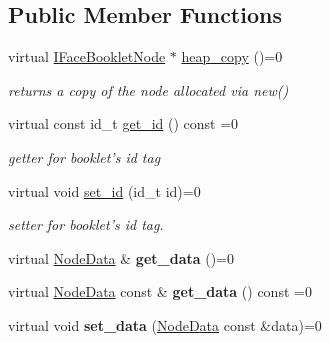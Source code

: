 \subsection*{Public Member Functions}
\begin{DoxyCompactItemize}
\item 
\hypertarget{structfb_1_1_i_face_booklet_node_a9bc90104d8cb2953baee204811aab1cf}{virtual \hyperlink{structfb_1_1_i_face_booklet_node}{I\+Face\+Booklet\+Node} $\ast$ \hyperlink{structfb_1_1_i_face_booklet_node_a9bc90104d8cb2953baee204811aab1cf}{heap\+\_\+copy} ()=0}\label{structfb_1_1_i_face_booklet_node_a9bc90104d8cb2953baee204811aab1cf}

\begin{DoxyCompactList}\small\item\em returns a copy of the node allocated via new() \end{DoxyCompactList}\item 
virtual const id\+\_\+t \hyperlink{structfb_1_1_i_face_booklet_node_a651a6fb7445f8d2c046066c1d381f424}{get\+\_\+id} () const =0
\begin{DoxyCompactList}\small\item\em getter for booklet's id tag \end{DoxyCompactList}\item 
virtual void \hyperlink{structfb_1_1_i_face_booklet_node_a944a07a514d6c88414c533dc7be3193d}{set\+\_\+id} (id\+\_\+t id)=0
\begin{DoxyCompactList}\small\item\em setter for booklet's id tag. \end{DoxyCompactList}\item 
\hypertarget{structfb_1_1_i_face_booklet_node_acfe552a2e1c8b67bb2ffeb22e319251d}{virtual \hyperlink{classfb_1_1_node_data}{Node\+Data} \& {\bfseries get\+\_\+data} ()=0}\label{structfb_1_1_i_face_booklet_node_acfe552a2e1c8b67bb2ffeb22e319251d}

\item 
\hypertarget{structfb_1_1_i_face_booklet_node_a5f41418b1a6d7100b6ab340a63046713}{virtual \hyperlink{classfb_1_1_node_data}{Node\+Data} const \& {\bfseries get\+\_\+data} () const =0}\label{structfb_1_1_i_face_booklet_node_a5f41418b1a6d7100b6ab340a63046713}

\item 
\hypertarget{structfb_1_1_i_face_booklet_node_a715b1a3ece12f6cf4fcb115c0cd6db5e}{virtual void {\bfseries set\+\_\+data} (\hyperlink{classfb_1_1_node_data}{Node\+Data} const \&data)=0}\label{structfb_1_1_i_face_booklet_node_a715b1a3ece12f6cf4fcb115c0cd6db5e}


\end{DoxyCompactItemize}
